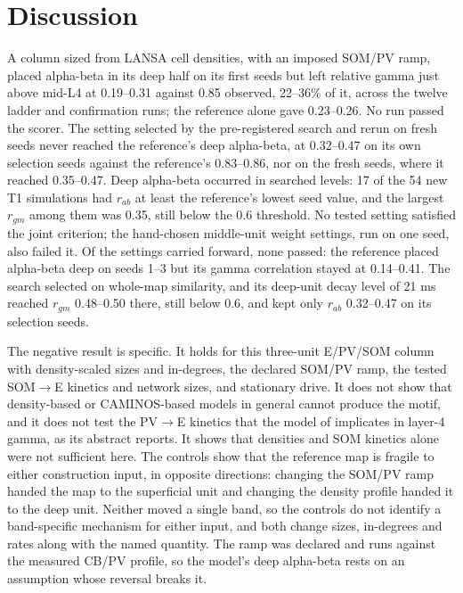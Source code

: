 \section{Discussion}

A column sized from LANSA cell densities, with an imposed SOM/PV ramp, placed alpha-beta in its deep half on its
first seeds but left relative gamma just above mid-L4 at 0.19--0.31 against 0.85 observed, 22--36\% of it, across the twelve ladder and confirmation runs; the reference alone gave 0.23--0.26. No run
passed the scorer. The setting selected by the pre-registered search and rerun on fresh seeds never reached the
reference's deep alpha-beta, at 0.32--0.47 on its own selection seeds against the reference's 0.83--0.86, nor on
the fresh seeds, where it reached 0.35--0.47. Deep alpha-beta occurred in searched levels: 17 of the 54 new T1 simulations had
$r_{ab}$ at least the reference's lowest seed value, and the largest $r_{gm}$ among them was 0.35, still below the 0.6 threshold. No tested setting
satisfied the joint criterion; the hand-chosen middle-unit weight settings, run on one seed, also failed it. Of the settings carried forward, none passed: the reference placed alpha-beta deep on seeds 1--3 but its gamma correlation stayed at 0.14--0.41. The
search selected on whole-map similarity, and its deep-unit decay level of 21 ms reached
$r_{gm}$ 0.48--0.50 there, still below 0.6, and kept only $r_{ab}$ 0.32--0.47 on its selection seeds.

The negative result is specific. It holds for this three-unit E/PV/SOM column with density-scaled sizes and
in-degrees, the declared SOM/PV ramp, the tested SOM$\to$E kinetics and network sizes, and stationary drive. It does
not show that density-based or CAMINOS-based models in general cannot produce the motif, and it does not test the
PV$\to$E kinetics that the model of \citet{Herrera2026} implicates in layer-4 gamma, as its abstract reports. It
shows that densities and SOM
kinetics alone were not sufficient here. The controls show that the reference map is fragile to either
construction input, in opposite directions: changing the SOM/PV ramp handed the map to the superficial unit and
changing the density profile handed it to the deep unit. Neither moved a single band, so the controls do not
identify a band-specific mechanism for either input, and both change sizes, in-degrees and rates along with the
named quantity. The ramp was declared and runs against the measured CB/PV profile, so the model's deep alpha-beta
rests on an assumption whose reversal breaks it.

